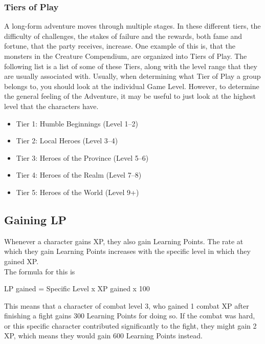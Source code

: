 \subsubsection{Tiers of Play}\label{subsubsec:tiersOfPlay}
A long-form adventure moves through multiple stages.
In these different tiers, the difficulty of challenges, the stakes of failure and the rewards, both fame and fortune, that the party receives, increase.
One example of this is, that the monsters in the Creature Compendium, are organized into Tiers of Play.
The following list is a list of some of these Tiers, along with the level range that they are usually associated with.
Usually, when determining what Tier of Play a group belongs to, you should look at the individual Game Level.
However, to determine the general feeling of the Adventure, it may be useful to just look at the highest level that the characters have.

\begin{itemize}
	\item Tier 1: Humble Beginnings (Level 1--2)
	\item Tier 2: Local Heroes (Level 3--4)
	\item Tier 3: Heroes of the Province (Level 5--6)
	\item Tier 4: Heroes of the Realm (Level 7--8)
	\item Tier 5: Heroes of the World (Level 9+)
\end{itemize}


\subsection{Gaining LP}\label{subsec:gainingCP}

Whenever a character gains XP, they also gain Learning Points.
The rate at which they gain Learning Points increases with the specific level in which they gained XP.\\
The formula for this is\\

\begin{center}
	LP gained = Specific Level x XP gained  x 100
\end{center}

This means that a character of combat level 3, who gained 1 combat XP after finishing a fight gains 300 Learning Points for doing so.
If the combat was hard, or this specific character contributed significantly to the fight, they might gain 2 XP, which means they would gain 600 Learning Points instead.\\

